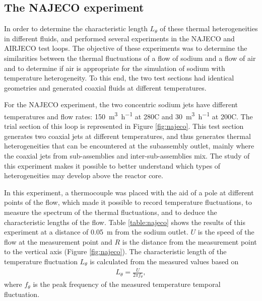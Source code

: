 \vspace*{-3mm}
\subsection{The NAJECO experiment}

    In order to determine the characteristic length $L_{\theta}$ of these thermal heterogeneities in different fluids, \cite{Tenchine1994Jetscoaxiaux:} and
\cite{Tenchine1994Jetscoaxiaux:a} performed several experiments in the NAJECO and AIRJECO test loops. The objective of these experiments was to determine the
similarities between the thermal fluctuations of a flow of sodium and a flow of air and to determine if air is appropriate for the simulation of sodium with
temperature heterogeneity. To this end, the two test sections had identical geometries and generated coaxial fluids at different temperatures.

    For the NAJECO experiment, the two concentric sodium jets have different temperatures and flow rates: \SI{150}{\cubic\meter\per\hour} at
\num{280}\textdegree{}C and \SI{30}{\cubic\meter\per\hour} at \num{200}\textdegree{}C. The trial section of this loop is represented in Figure \ref{fig:najeco}.
    This test section generates two coaxial jets at different temperatures, and thus generates thermal heterogeneities that can be encountered at the
subassembly outlet, mainly where the coaxial jets from sub-assemblies and inter-sub-assemblies mix. The study of this experiment makes it possible to better
understand which types of heterogeneities may develop above the reactor core.

    In this experiment, a thermocouple was placed with the aid of a pole at different points of the flow, which made it possible to record temperature
fluctuations, to measure the spectrum of the thermal fluctuations, and to deduce the characteristic lengths of the flow.
    Table \ref{table:najeco} shows the results of this experiment at a distance of \SI{0.05}{\meter} from the sodium outlet.
    $U$ is the speed of the flow at the measurement point and $R$ is the distance from the measurement point to the vertical axis (Figure \ref{fig:najeco}).
    The characteristic length of the temperature fluctuation $L_{\theta}$ is calculated from the measured values based on
    \begin{align}\label{eq:I_4}
        L_{\theta} = \frac{U}{2\pi f_{\theta}},
    \end{align}
    where $f_{\theta}$ is the peak frequency of the measured temperature temporal fluctuation.

